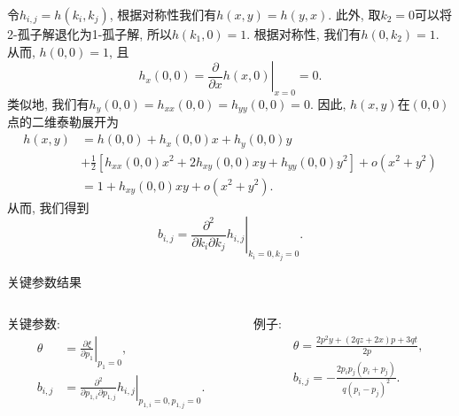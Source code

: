 \documentclass{beamer}
\newcommand{\mbrace}[1]{\left[#1\right]}
\newcommand{\eval}[2]{\left.{#1}\right|_{#2}}
\begin{document}
\begin{frame}
令$h_{i,j}=h(k_i,k_j)$, 根据对称性我们有$h(x,y)=h(y,x)$. 此外, 取$k_2=0$可以将2-孤子解退化为1-孤子解, 所以$h(k_1,0)=1$. 根据对称性, 我们有$h(0,k_2)=1$. 从而, $h(0,0)=1$, 且
\begin{equation*}
    h_x(0,0)=\eval{\frac{\partial}{\partial x}h(x,0)}{x=0}=0.
\end{equation*}
类似地, 我们有$h_y(0,0)=h_{xx}(0,0)=h_{yy}(0,0)=0$. 因此, $h(x,y)$在$(0,0)$点的二维泰勒展开为 
\begin{equation*}
\begin{split}
h(x,y)&=h(0,0)+h_x(0,0)x+h_y(0,0)y \\ 
&+\frac{1}{2}\mbrace{h_{xx}(0,0)x^2+2h_{xy}(0,0)xy+h_{yy}(0,0)y^2}+o(x^2+y^2) \\ 
&=1+h_{xy}(0,0)xy+o(x^2+y^2).
\end{split}
\end{equation*}
从而, 我们得到
\begin{equation*}
    b_{i,j}=\eval{\frac{\partial^2}{\partial k_i\partial k_j}h_{i,j}}{k_i=0,k_j=0}.
\end{equation*}
\end{frame}

\begin{frame}{关键参数结果}
\begin{columns}
\begin{column}{0.5\textwidth}
关键参数:
\[
\begin{split}
    \theta &= \eval{\frac{\partial \xi}{\partial p_1}}{p_1=0}, \\
    b_{i,j}&= \eval{\frac{\partial^2}{\partial p_{1,i}\partial p_{1,j}}h_{i,j}}{p_{1,i}=0,p_{1,j}=0}.
\end{split}
\]
\end{column}
\begin{column}{0.5\textwidth}
例子:
\[
\begin{split}
    &\theta=\frac{2p^2y+(2qz+2x)p+3qt}{2p}, \\ 
    &b_{i,j}=-\frac{2p_ip_j(p_i+p_j)}{q(p_i-p_j)^2}.
\end{split}
\]
\end{column}
\end{columns}
\end{frame}
\end{document}

